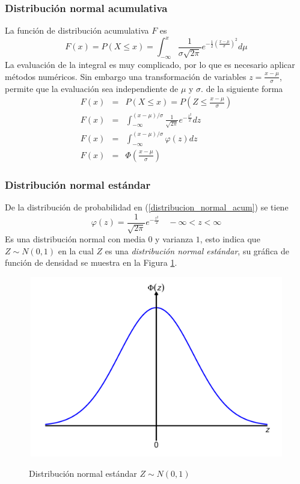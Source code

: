 \subsubsection{Distribución normal acumulativa}
La función de distribución acumulativa $F$ es
\begin{equation}
	F(x) = P(X \leq x) = \int_{-\infty}^{x} \frac{1}{\sigma \sqrt{2 \pi}} {e}^{-\frac{1}{2} {\left( \frac{x- \mu}{\sigma} \right)}^{2}} d \mu
\end{equation}
La evaluación de la integral es muy complicado, por lo que es necesario aplicar métodos numéricos. Sin embargo una transformación de variables $z = \frac{x-\mu}{\sigma}$, permite que la evaluación sea independiente de $\mu$ y $\sigma$. de la siguiente forma
\begin{eqnarray}
	F(x) &=& P(X \leq x) = P \left( Z \leq \frac{x-\mu}{\sigma} \right) \nonumber \\
	F(x) &=& \int_{- \infty}^{(x-\mu) / \sigma} \frac{1}{\sqrt{2 \pi}} {e}^{- \frac{{z}^{2}}{2}}dz \nonumber \\
	\label{distribucion_normal_acum}
	F(x) &=& \int_{- \infty}^{(x - \mu)/ \sigma} \varphi (z)dz \nonumber \\
	F(x) &=& \Phi \left( \frac{x-\mu}{\sigma} \right)
\end{eqnarray}

\subsubsection{Distribución normal estándar}
De la distribución de probabilidad en (\ref{distribucion_normal_acum}) se tiene
\begin{equation}
	\varphi (z) = \frac{1}{\sqrt{2 \pi}} {e}^{- \frac{{z}^{2}}{2}} \quad -\infty < z < \infty
\end{equation}
Es una distribución normal con media $0$ y varianza $1$, esto indica que $Z \sim N(0,1)$ en la cual $Z$ es una \textsl{distribución normal estándar}, su gráfica de función de densidad se muestra en la Figura \ref{fig:norm_z}.
\begin{figure}[H]
  \caption{Distribución normal estándar $Z \sim N(0,1)$}
  {\includegraphics[width=15cm, height=7.9cm]{images/norm_estn.pdf}}
  \label{fig:norm_z}
\end{figure}

